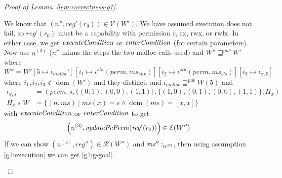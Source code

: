 \documentclass[a4paper]{article}
\newcommand{\update}[2]{[#1 \mapsto #2]}
\DeclareMathOperator{\dom}{dom}
\newcommand{\var}[1]{\mathit{#1}}
\newcommand{\hs}{\var{ms}}
\newcommand{\ms}{\hs}
\newcommand{\reg}{\var{reg}}
\newcommand{\heap}{\var{mem}}
\newcommand{\perm}{\var{perm}}
\newcommand{\sta}{\var{sta}}
\newcommand{\plainfun}[2]{
  \ifthenelse{\equal{#2}{}}
  {\mathit{#1}}
  {\mathit{#1}(#2)}
}
\newcommand{\updatePcPerm}[1]{\plainfun{updatePcPerm}{#1}}
\newcommand{\execCond}[1]{\plainfun{executeCondition}{#1}}
\newcommand{\entryCond}[1]{\plainfun{enterCondition}{#1}}
\newcommand{\futurewk}{\mathbin{\sqsupseteq}^{\var{pub}}}
\newcommand{\heapSat}[3][\heap]{#1 :_{#2} #3}
\newcommand{\memSat}[3][n]{\heapSat[#2]{#1}{#3}}
\newcommand{\codelabel}[1]{\mathit{#1}}
\newcommand{\malloc}{\codelabel{malloc}}
\newcommand{\asmType}{\plaindom{AsmType}}
\newcommand{\plaindom}[1]{\mathrm{#1}}
\newcommand{\intr}[2]{\mathcal{#1}}
\newcommand{\valueintr}[1]{\intr{V}{#1}}
\newcommand{\exprintr}[1]{\intr{E}{#1}}
\newcommand{\regintr}[1]{\intr{R}{#1}}
\newcommand{\stdvr}{\valueintr{\asmType}}
\newcommand{\stder}{\exprintr{\asmType}}
\newcommand{\stdrr}{\regintr{\asmType}}
\newcommand{\npair}[2][n]{\left(#1,#2 \right)}
\newcommand{\plainperm}[1]{\mathrm{#1}}
\newcommand{\exec}{\plainperm{rx}}
\newcommand{\entry}{\plainperm{e}}
\newcommand{\rwx}{\plainperm{rwx}}
\newcommand{\rwlx}{\plainperm{rwlx}}
\begin{document}
\begin{proof}[Proof of Lemma~\ref{lem:correctness-g1}]
\begin{enumproof}
\begin{enumproof}
\[      \]
      We know that $\npair[n'']{\reg'(r_0)} \in \stdvr(W')$. We have assumed execution does not fail, so $\reg'(r_0)$ must be a capability with permission $\entry$, $\exec$, $\rwx$, or $\rwlx$. In either case, we get $\execCond{}$ or $\entryCond{}$ (for certain parameters). Now use $n^{(3)}$ ($n''$ minus the steps the two malloc calls used) and $W'' \futurewk W'$ where
      \[
        W'' = W'\update{5}{\iota_\malloc'}
        \update{i_1}{\iota^\sta (\perm,\ms_{\var{env}})}
        \update{i_2}{\iota^\sta (\perm,\ms_{\var{cls}})}
        \update{i_3}{\iota_{x,0}}
      \]
      where $i_1,i_2,i_3 \not\in\dom(W')$ and they distinct, and $\iota_\malloc \futurewk W(5)$ and
      \begin{align*}
        \iota_{x,s} & = (\perm,s,\{(0,1),(0,0),(1,1)\},\{(1,0),(0,1),(0,0),(1,1)\},H_x) \\
        H_x \; s \; W & = \{\npair{\ms} \mid \ms(x) = s \land \dom(\ms) = [x,x]\}
      \end{align*}
      with $\execCond{}$ or $\entryCond{}$ to get
      \[
        \npair[n^{(3)}]{\updatePcPerm{\reg'(r_0)}} \in \stder(W'')
      \]
      If we can show $\npair[n^{(3)}]{\reg''} \in \stdrr(W'')$ and $\memSat[n^{(3)}]{\ms''}$, then using assumption \ref{g1:execution} we can get \ref{g1:g-goal}.


\end{enumproof}
\end{enumproof}
\end{proof}
\end{document}
